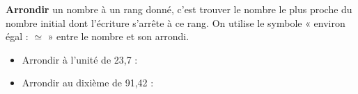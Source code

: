 \begin{Définition}[c]
\textbf{Arrondir} un nombre à un rang donné, c'est trouver le nombre le plus proche du nombre initial dont l'écriture s'arrête à ce rang. On utilise le symbole « environ égal : $\simeq$ » entre le nombre et son arrondi.
\end{Définition}

\begin{Exemples}
\begin{itemize}
\item Arrondir à l'unité de 23,7 : \ligne

\item Arrondir au dixième de 91,42 : \ligne

\ligne

\end{itemize}
\end{Exemples}
